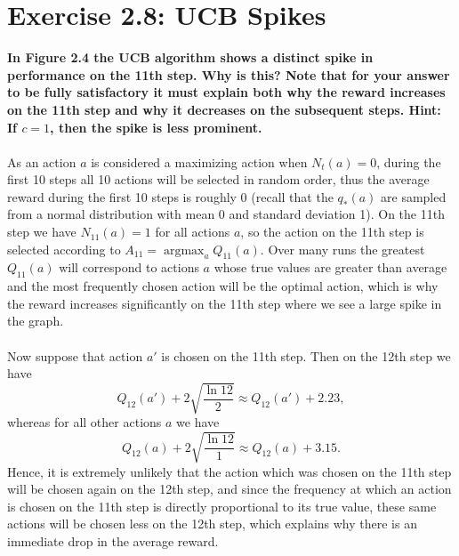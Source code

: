 \documentclass[a4paper,11pt]{article}
\numberwithin{equation}{section}
\theoremstyle{remark}
\DeclareMathOperator*{\argmax}{argmax}
\begin{document}
\section{Exercise 2.8: UCB Spikes}

\textbf{In Figure 2.4 the UCB algorithm shows a distinct spike in performance on the 11th step. Why is this? Note that for your answer to be fully satisfactory it must explain both why the reward increases on the 11th step and why it decreases on the subsequent steps. Hint: If $c = 1$, then the spike is less prominent.}
\\ \\
As an action $a$ is considered a maximizing action when $N_t(a)=0$, during the first 10 steps all 10 actions will be selected in random order, thus the average reward during the first 10 steps is roughly 0 (recall that the $q_*(a)$ are sampled from a normal distribution with mean 0 and standard deviation 1). On the 11th step we have $N_{11}(a)=1$ for all actions $a$, so the action on the 11th step is selected according to $A_{11} = \argmax_a Q_{11}(a)$. Over many runs the greatest $Q_{11}(a)$ will correspond to actions $a$ whose true values are greater than average and the most frequently chosen action will be the optimal action, which is why the reward increases significantly on the 11th step where we see a large spike in the graph.
\\ \\
Now suppose that action $a'$ is chosen on the 11th step. Then on the 12th step we have
\[
	Q_{12}(a') + 2\sqrt{\frac{\ln 12}{2}} \approx 	Q_{12}(a') + 2.23,
\]
whereas for all other actions $a$ we have
\[
Q_{12}(a) + 2\sqrt{\frac{\ln 12}{1}} \approx Q_{12}(a) + 3.15.
\]
Hence, it is extremely unlikely that the action which was chosen on the 11th step will be chosen again on the 12th step, and since the frequency at which an action is chosen on the 11th step is directly proportional to its true value, these same actions will be chosen less on the 12th step, which explains why there is an immediate drop in the average reward.
\end{document}
